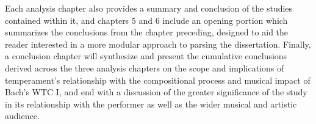 Each analysis chapter also provides a summary and conclusion of the
studies contained within it, and chapters 5 and 6 include an opening
portion which summarizes the conclusions from the chapter preceding,
designed to aid the reader interested in a more modular approach to
parsing the dissertation. Finally, a conclusion chapter will synthesize
and present the cumulative conclusions derived across the three analysis
chapters on the scope and implications of temperament's relationship
with the compositional process and musical impact of Bach's WTC I, and
end with a discussion of the greater significance of the study in its
relationship with the performer as well as the wider musical and
artistic audience.


    
    
    
